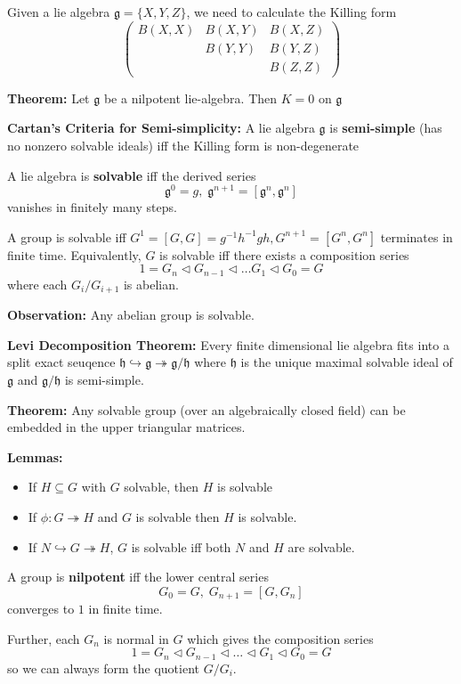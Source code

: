 \documentclass[12pt]{article}
\newcommand{\g}{\mathfrak{g}}
\newcommand{\h}{\mathfrak{h}}
\begin{document}
Given a lie algebra $\g = \{X, Y, Z\}$, we need to calculate the Killing form 
\[\begin{pmatrix}
    B(X, X) & B(X, Y) & B(X, Z)\\ 
    & B(Y, Y) & B(Y, Z)\\
    && B(Z, Z)
\end{pmatrix}\]

\textbf{Theorem:} Let $\g$ be a nilpotent lie-algebra. Then $K = 0$ on $\g$ 

\textbf{Cartan's Criteria for Semi-simplicity:} A lie algebra $\g$ is\textbf{ semi-simple} (has no nonzero solvable ideals) iff the Killing form is non-degenerate

A lie algebra is \textbf{solvable} iff the derived series 
\[\g^0 = g, \; \g^{n+1} = [\g^n, \g^n]\]
vanishes in finitely many steps. 

A group is solvable iff $G^1 = [G, G] = g^{-1}h^{-1}gh, G^{n+1} = [G^n, G^n]$ terminates in finite time. Equivalently, $G$ is solvable iff there exists a composition series
\[1 = G_n \triangleleft G_{n-1} \triangleleft \dots G_1 \triangleleft G_0 = G\]
where each $G_i/G_{i+1}$ is abelian. 

\textbf{Observation:} Any abelian group is solvable. 

\textbf{Levi Decomposition Theorem:} Every finite dimensional lie algebra fits into a split exact seuqence $\h \hookrightarrow \g \twoheadrightarrow \g/\h$ where $\h$ is the unique maximal solvable ideal of $\g$ and $\g/\h$ is semi-simple. 

\textbf{Theorem:} Any solvable group (over an algebraically closed field) can be embedded in the upper triangular matrices. 

\textbf{Lemmas:}
\begin{itemize}
    \item If $H \subseteq G$ with $G$ solvable, then $H$ is solvable 
    \item If $\phi: G \twoheadrightarrow H$ and $G$ is solvable then $H$ is solvable. 
    \item If $N \hookrightarrow G \twoheadrightarrow H$, $G$ is solvable iff both $N$ and $H$ are solvable. 
\end{itemize}

A group is \textbf{nilpotent} iff the lower central series 
\[G_0 = G, \; G_{n+1} = [G, G_n]\]
converges to $1$ in finite time. 

Further, each $G_n$ is normal in $G$ which gives the composition series 
\[1 = G_n \triangleleft G_{n-1} \triangleleft \dots \triangleleft G_1 \triangleleft G_0 = G\]
so we can always form the quotient $G/G_i$. 
\end{document}
